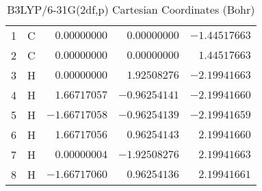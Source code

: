 \documentclass[10pt,oneside]{article}
\begin{document}
\begin{table}[h]
\centering
\caption{B3LYP/6-31G(2df,p) Cartesian Coordinates (Bohr)}
\begin{tabular}{llrrr}
\toprule
1  & C  & $ 0.00000000$ & $ 0.00000000$ & $-1.44517663$ \\
2  & C  & $ 0.00000000$ & $ 0.00000000$ & $ 1.44517663$ \\
3  & H  & $ 0.00000000$ & $ 1.92508276$ & $-2.19941663$ \\
4  & H  & $ 1.66717057$ & $-0.96254141$ & $-2.19941660$ \\
5  & H  & $-1.66717058$ & $-0.96254139$ & $-2.19941659$ \\
6  & H  & $ 1.66717056$ & $ 0.96254143$ & $ 2.19941660$ \\
7  & H  & $ 0.00000004$ & $-1.92508276$ & $ 2.19941663$ \\
8  & H  & $-1.66717060$ & $ 0.96254136$ & $ 2.19941661$ \\
\bottomrule
\end{tabular}
\end{table}
\end{document}
